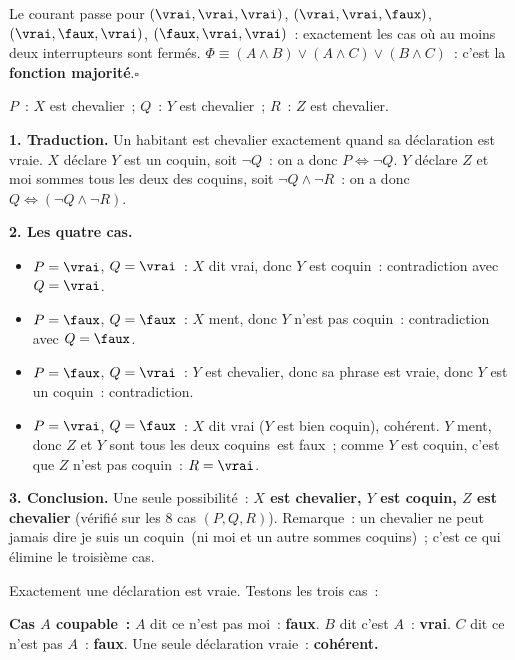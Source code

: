 Le courant passe pour $(\vrai,\vrai,\vrai)$, $(\vrai,\vrai,\faux)$,
$(\vrai,\faux,\vrai)$, $(\faux,\vrai,\vrai)$~: exactement les cas o\`u au moins
deux interrupteurs sont ferm\'es. $\Phi\equiv(A\land B)\lor(A\land C)\lor(B\land C)$~:
c'est la \textbf{fonction majorit\'e}.\hfill$\square$


$P$~: \og$X$ est chevalier\fg~; $Q$~: \og$Y$ est chevalier\fg~; $R$~: \og$Z$ est chevalier\fg.

\textbf{1. Traduction.} Un habitant est chevalier exactement quand sa d\'eclaration est vraie.
$X$ d\'eclare \og$Y$ est un coquin\fg, soit $\lnot Q$~: on a donc $P\Leftrightarrow\lnot Q$.
$Y$ d\'eclare \og$Z$ et moi sommes tous les deux des coquins\fg, soit $\lnot Q\land\lnot R$~:
on a donc $Q\Leftrightarrow(\lnot Q\land\lnot R)$.

\textbf{2. Les quatre cas.}
\begin{itemize}
  \item $P=\vrai$, $Q=\vrai$~: $X$ dit vrai, donc $Y$ est coquin~: contradiction avec $Q=\vrai$.
  \item $P=\faux$, $Q=\faux$~: $X$ ment, donc $Y$ n'est pas coquin~: contradiction avec $Q=\faux$.
  \item $P=\faux$, $Q=\vrai$~: $Y$ est chevalier, donc sa phrase est vraie, donc $Y$ est un coquin~:
        contradiction.
  \item $P=\vrai$, $Q=\faux$~: $X$ dit vrai ($Y$ est bien coquin), coh\'erent.
        $Y$ ment, donc \og $Z$ et $Y$ sont tous les deux coquins\fg\ est faux~;
        comme $Y$ est coquin, c'est que $Z$ n'est pas coquin~: $R=\vrai$.
\end{itemize}

\textbf{3. Conclusion.} Une seule possibilit\'e~: \textbf{$X$ est chevalier, $Y$ est coquin,
$Z$ est chevalier} (v\'erifi\'e sur les $8$ cas $(P,Q,R)$).
Remarque~: un chevalier ne peut jamais dire \og je suis un coquin\fg\ (ni \og moi et un autre
sommes coquins\fg)~; c'est ce qui \'elimine le troisi\`eme cas.


Exactement une d\'eclaration est vraie. Testons les trois cas~:

\textbf{Cas $A$ coupable~:} $A$ dit \og ce n'est pas moi\fg~: \textbf{faux}.
$B$ dit \og c'est $A$\fg~: \textbf{vrai}.
$C$ dit \og ce n'est pas $A$\fg~: \textbf{faux}.
Une seule d\'eclaration vraie~: \textbf{coh\'erent.}

